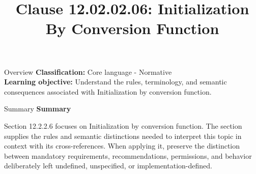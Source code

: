 \documentclass[10pt,letterpaper]{article}
\title{Clause 12.02.02.06: Initialization By Conversion Function}
\author{}
\date{}
\begin{document}
\maketitle
\begin{CornellOverviewBox}{Overview}
\textbf{Classification:} Core language - Normative\\[2pt]
\textbf{Learning objective:} Understand the rules, terminology, and semantic consequences associated with Initialization by conversion function.
\end{CornellOverviewBox}\begin{CornellSummaryBox}{Summary}
{\sffamily\bfseries\color{Accent} Summary}\par\vspace{3pt}Section 12.2.2.6 focuses on Initialization by conversion function. The section supplies the rules and semantic distinctions needed to interpret this topic in context with its cross-references. When applying it, preserve the distinction between mandatory requirements, recommendations, permissions, and behavior deliberately left undefined, unspecified, or implementation-defined.
\end{CornellSummaryBox}
\end{document}
